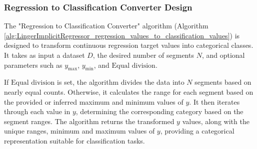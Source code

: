 \documentclass[a4paper, 12pt]{report}
\begin{document}
\subsubsection{Regression to Classification Converter Design}
The "Regression to Classification Converter" algorithm (Algorithm \ref{alg:LingerImplicitRegressor_regression_values_to_classification_values}) is designed to transform 
continuous regression target values into categorical classes. It takes as input a dataset $D$, the desired number of segments $N$, and optional parameters such as $y_{\text{max}}$, $y_{\text{min}}$, 
and $\text{Equal division}$.

If $\text{Equal division}$ is set, the algorithm divides the data into $N$ segments based on nearly equal counts. Otherwise, it calculates the range for each segment based on the 
provided or inferred maximum and minimum values of $y$. It then iterates through each value in $y$, determining the corresponding category based on the segment ranges. 
The algorithm returns the transformed $y$ values, along with the unique ranges, minimum and maximum values of $y$, providing a categorical representation suitable for classification tasks.
\end{document}
